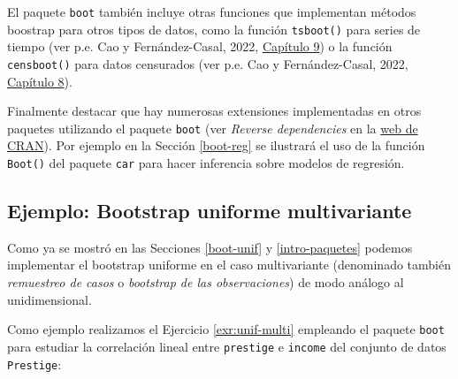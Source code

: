 \documentclass[
  spanish,
  10pt,
]{book}
\newenvironment{Shaded}{\begin{snugshade}}{\end{snugshade}}
\newcommand{\AttributeTok}[1]{\textcolor[rgb]{0.13,0.29,0.53}{#1}}
\newcommand{\ControlFlowTok}[1]{\textcolor[rgb]{0.13,0.29,0.53}{\textbf{#1}}}
\newcommand{\DecValTok}[1]{\textcolor[rgb]{0.00,0.00,0.81}{#1}}
\newcommand{\FunctionTok}[1]{\textcolor[rgb]{0.13,0.29,0.53}{\textbf{#1}}}
\newcommand{\NormalTok}[1]{#1}
\newcommand{\OtherTok}[1]{\textcolor[rgb]{0.56,0.35,0.01}{#1}}
\newcommand{\SpecialCharTok}[1]{\textcolor[rgb]{0.81,0.36,0.00}{\textbf{#1}}}
\theoremstyle{break}
\theoremstyle{nonumberplain}
\begin{document}
El paquete \texttt{boot} también incluye otras funciones que implementan métodos boostrap para otros tipos de datos, como la función \texttt{tsboot()} para series de tiempo (ver p.e. Cao y Fernández-Casal, 2022, \href{https://rubenfcasal.github.io/book_remuestreo/bootdep.html}{Capítulo 9}) o la función \texttt{censboot()} para datos censurados (ver p.e. Cao y Fernández-Casal, 2022, \href{https://rubenfcasal.github.io/book_remuestreo/bootcen.html}{Capítulo 8}).

Finalmente destacar que hay numerosas extensiones implementadas en otros paquetes utilizando el paquete \texttt{boot} (ver \emph{Reverse dependencies} en la \href{https://cran.r-project.org/package=boot}{web de CRAN}).
Por ejemplo en la Sección \ref{boot-reg} se ilustrará el uso de la función \texttt{Boot()} del paquete \texttt{car} para hacer inferencia sobre modelos de regresión.

\subsection{Ejemplo: Bootstrap uniforme multivariante}\label{boot-unif-multi}

Como ya se mostró en las Secciones \ref{boot-unif} y \ref{intro-paquetes} podemos implementar el bootstrap uniforme en el caso multivariante (denominado también \emph{remuestreo de casos} o \emph{bootstrap de las observaciones}) de modo análogo al unidimensional.

Como ejemplo realizamos el Ejercicio \ref{exr:unif-multi} empleando el paquete \texttt{boot} para estudiar la correlación lineal entre \texttt{prestige} e \texttt{income} del conjunto de datos \texttt{Prestige}:

\begin{Shaded}
\end{Shaded}
\end{document}

